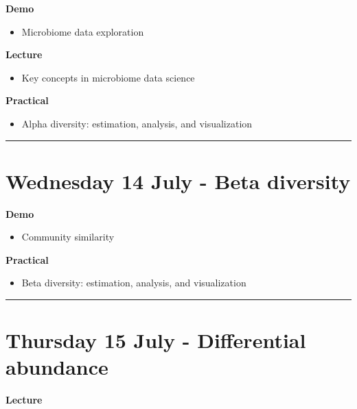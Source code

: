 \documentclass[
]{book}
\providecommand{\tightlist}{%
  \setlength{\itemsep}{0pt}\setlength{\parskip}{0pt}}
\begin{document}
\textbf{Demo}

\begin{itemize}
\tightlist
\item
  Microbiome data exploration
\end{itemize}

\textbf{Lecture}

\begin{itemize}
\tightlist
\item
  Key concepts in microbiome data science
\end{itemize}

\textbf{Practical}

\begin{itemize}
\tightlist
\item
  Alpha diversity: estimation, analysis, and visualization
\end{itemize}

\begin{center}\rule{0.5\linewidth}{0.5pt}\end{center}

\hypertarget{wednesday-14-july---beta-diversity}{%
\section{Wednesday 14 July - Beta diversity}\label{wednesday-14-july---beta-diversity}}

\textbf{Demo}

\begin{itemize}
\tightlist
\item
  Community similarity
\end{itemize}

\textbf{Practical}

\begin{itemize}
\tightlist
\item
  Beta diversity: estimation, analysis, and visualization
\end{itemize}

\begin{center}\rule{0.5\linewidth}{0.5pt}\end{center}

\hypertarget{thursday-15-july---differential-abundance}{%
\section{Thursday 15 July - Differential abundance}\label{thursday-15-july---differential-abundance}}

\textbf{Lecture}
\end{document}
